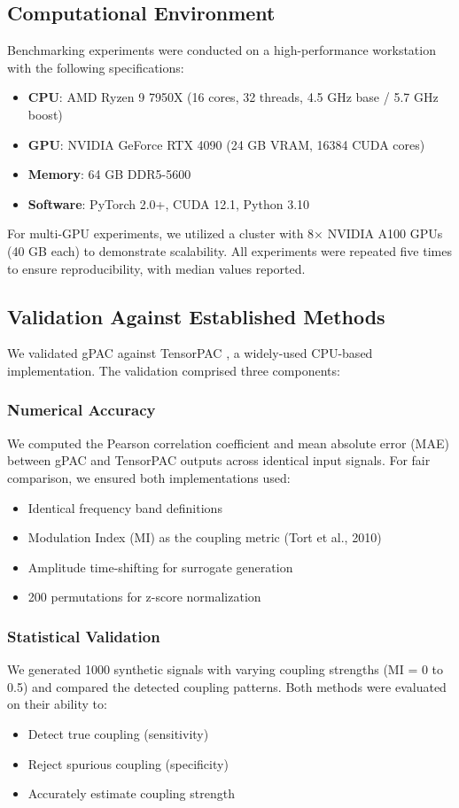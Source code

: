 \subsection{Computational Environment}
Benchmarking experiments were conducted on a high-performance workstation with the following specifications:

\begin{itemize}
\item \textbf{CPU}: AMD Ryzen 9 7950X (16 cores, 32 threads, 4.5 GHz base / 5.7 GHz boost)
\item \textbf{GPU}: NVIDIA GeForce RTX 4090 (24 GB VRAM, 16384 CUDA cores)
\item \textbf{Memory}: 64 GB DDR5-5600
\item \textbf{Software}: PyTorch 2.0+, CUDA 12.1, Python 3.10
\end{itemize}

For multi-GPU experiments, we utilized a cluster with 8× NVIDIA A100 GPUs (40 GB each) to demonstrate scalability. All experiments were repeated five times to ensure reproducibility, with median values reported.

\subsection{Validation Against Established Methods}
We validated gPAC against TensorPAC \citep{Combrisson2020}, a widely-used CPU-based implementation. The validation comprised three components:

\subsubsection{Numerical Accuracy}
We computed the Pearson correlation coefficient and mean absolute error (MAE) between gPAC and TensorPAC outputs across identical input signals. For fair comparison, we ensured both implementations used:
\begin{itemize}
\item Identical frequency band definitions
\item Modulation Index (MI) as the coupling metric (Tort et al., 2010)
\item Amplitude time-shifting for surrogate generation
\item 200 permutations for z-score normalization
\end{itemize}

\subsubsection{Statistical Validation}
We generated 1000 synthetic signals with varying coupling strengths (MI = 0 to 0.5) and compared the detected coupling patterns. Both methods were evaluated on their ability to:
\begin{itemize}
\item Detect true coupling (sensitivity)
\item Reject spurious coupling (specificity)
\item Accurately estimate coupling strength
\end{itemize}

